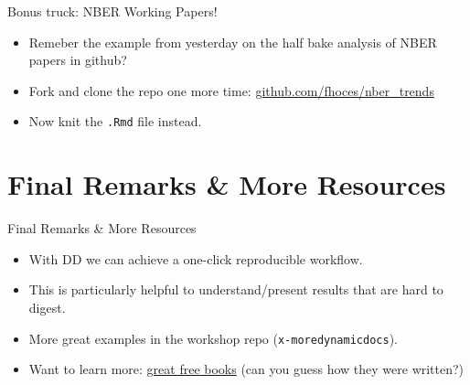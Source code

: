 \documentclass[ignorenonframetext,]{beamer}
\providecommand{\tightlist}{%
  \setlength{\itemsep}{0pt}\setlength{\parskip}{0pt}}
\begin{document}
\begin{frame}[fragile]{Bonus truck: NBER Working Papers!}
\protect\hypertarget{bonus-truck-nber-working-papers}{}

\begin{itemize}
\item
  Remeber the example from yesterday on the half bake analysis of NBER
  papers in github?
\item
  Fork and clone the repo one more time:
  \href{https://github.com/fhoces/nber_trends}{github.com/fhoces/nber\_trends}
\item
  Now knit the \texttt{.Rmd} file instead.
\end{itemize}

\end{frame}

\hypertarget{final-remarks-more-resources}{%
\section{Final Remarks \& More
Resources}\label{final-remarks-more-resources}}

\begin{frame}[fragile]{Final Remarks \& More Resources}
\protect\hypertarget{final-remarks-more-resources-1}{}

\begin{itemize}
\tightlist
\item
  With DD we can achieve a one-click reproducible workflow.
\item
  This is particularly helpful to understand/present results that are
  hard to digest.
\item
  More great examples in the workshop repo (\texttt{x-moredynamicdocs}).
\item
  Want to learn more: \href{https://bookdown.org/}{great free books}
  (can you guess how they were written?)
\end{itemize}

\end{frame}
\end{document}
